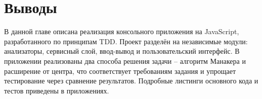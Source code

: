 \section{Выводы} \label{ch5:conclusion}

В данной главе описана реализация консольного приложения на JavaScript, разработанного по принципам TDD.
Проект разделён на независимые модули: анализаторы, сервисный слой, ввод-вывод и пользовательский интерфейс.
В приложении реализованы два способа решения задачи -- алгоритм Манакера и расширение от центра, что соответствует требованиям задания и упрощает тестирование через сравнение результатов.
Подробные листинги основного кода и тестов приведены в приложениях.
